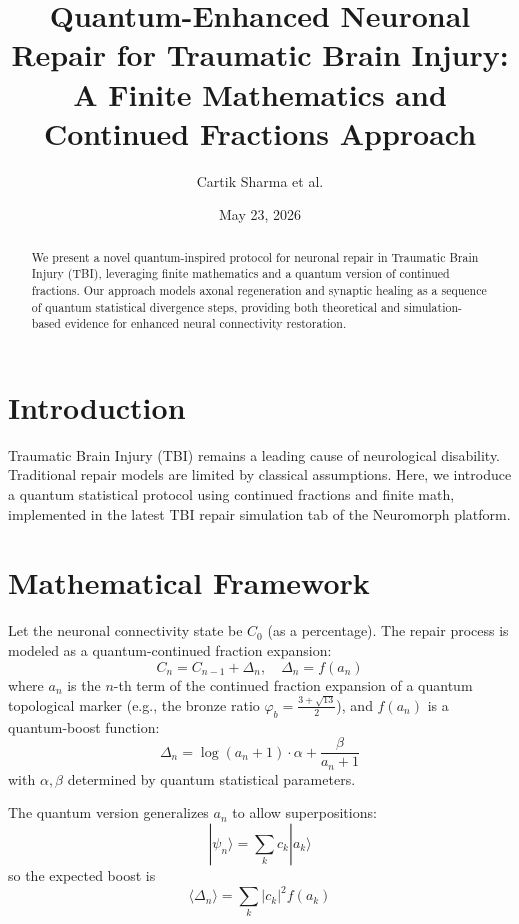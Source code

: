 \documentclass[12pt]{article}
\title{Quantum-Enhanced Neuronal Repair for Traumatic Brain Injury: \newline A Finite Mathematics and Continued Fractions Approach}
\author{Cartik Sharma et al.}
\date{May 23, 2026}
\begin{document}
\maketitle

\begin{abstract}
We present a novel quantum-inspired protocol for neuronal repair in Traumatic Brain Injury (TBI), leveraging finite mathematics and a quantum version of continued fractions. Our approach models axonal regeneration and synaptic healing as a sequence of quantum statistical divergence steps, providing both theoretical and simulation-based evidence for enhanced neural connectivity restoration.
\end{abstract}

\section{Introduction}
Traumatic Brain Injury (TBI) remains a leading cause of neurological disability. Traditional repair models are limited by classical assumptions. Here, we introduce a quantum statistical protocol using continued fractions and finite math, implemented in the latest TBI repair simulation tab of the Neuromorph platform.

\section{Mathematical Framework}
Let the neuronal connectivity state be $C_0$ (as a percentage). The repair process is modeled as a quantum-continued fraction expansion:
\begin{equation}
C_n = C_{n-1} + \Delta_n, \quad \Delta_n = f(a_n)
\end{equation}
where $a_n$ is the $n$-th term of the continued fraction expansion of a quantum topological marker (e.g., the bronze ratio $\varphi_b = \frac{3+\sqrt{13}}{2}$), and $f(a_n)$ is a quantum-boost function:
\begin{equation}
\Delta_n = \log(a_n+1) \cdot \alpha + \frac{\beta}{a_n+1}
\end{equation}
with $\alpha, \beta$ determined by quantum statistical parameters.

The quantum version generalizes $a_n$ to allow superpositions:
\begin{equation}
|\psi_n\rangle = \sum_{k} c_k |a_k\rangle
\end{equation}
so the expected boost is
\begin{equation}
\langle \Delta_n \rangle = \sum_k |c_k|^2 f(a_k)
\end{equation}
\end{document}
